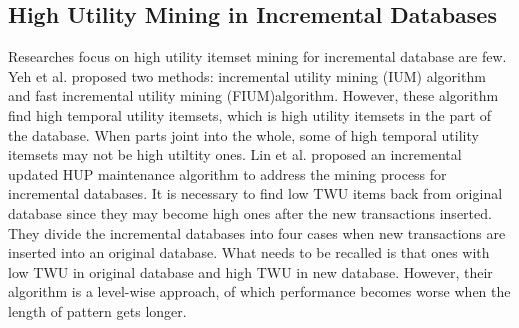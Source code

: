 \documentclass[runningheads,a4paper]{llncs}
\begin{document}

\subsection{High Utility Mining in Incremental Databases}
Researches focus on high utility itemset mining for incremental database are few. Yeh et al. \cite{Yeh:IUM} proposed two methods: incremental utility mining (IUM) algorithm and fast incremental utility mining (FIUM)algorithm. However, these algorithm find high temporal utility itemsets, which is high utility itemsets in the part of the database. When parts joint into the whole, some of high temporal utility itemsets may not be high utiltity ones. Lin et al. \cite{Lin:dynamic-databases,Lin:incremental-hui} proposed an incremental updated HUP maintenance algorithm to address the mining process for incremental databases. It is necessary to find low TWU items back from original database since they may become high ones after the new transactions inserted. They divide the incremental databases into four cases when new transactions are inserted into an original database. What needs to be recalled is that ones with low TWU in original database and high TWU in new database. However, their algorithm is a level-wise approach, of which performance becomes worse when the length of pattern gets longer.
\end{document}
